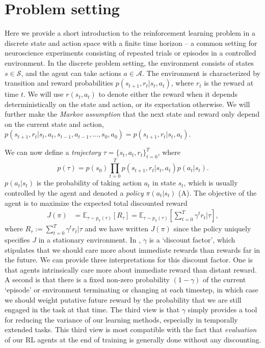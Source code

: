 \section{Problem setting}
\label{sec:problem_setting}

Here we provide a short introduction to the reinforcement learning problem in a discrete state and action space with a finite time horizon -- a common setting for neuroscience experiments consisting of repeated trials or episodes in a controlled environment.
In the discrete problem setting, the environment consists of states $s \in \mathcal{S}$, and the agent can take actions $a \in \mathcal{A}$.
The environment is characterized by transition and reward probabilities $p(s_{t+1}, r_t | s_t, a_t)$, where $r_t$ is the reward at time $t$.
We will use $r(s_t, a_t)$ to denote either the reward when it depends deterministically on the state and action, or its expectation otherwise.
We will further make the \emph{Markov assumption} that the next state and reward only depend on the current state and action, $p(s_{t+1}, r_t | s_t, a_t, s_{t-1}, a_{t-1}, ..., s_0, a_0) = p(s_{t+1}, r_t | s_t, a_t)$.



We can now define a \emph{trajectory} $\tau = \{ s_t, a_t, r_t \}_{t = 0}^T$, where
\begin{equation}
    p(\tau) = p(s_0) \prod_{t = 0}^T p(s_{t+1}, r_t | s_t, a_t) p(a_t|s_t).
\end{equation}
$p(a_t|s_t)$ is the probability of taking action $a_t$ in state $s_t$, which is usually controlled by the agent and denoted a \emph{policy} $\pi(a_t|s_t)$ (A).
The objective of the agent is to maximize the expected total discounted reward
\begin{align}
    \label{eq:RL_objective}
    J(\pi) &= \mathbb{E}_{\tau \sim p_\pi(\tau)} \left [ R_\tau \right ] = \mathbb{E}_{\tau \sim p_\pi(\tau)} \left [ \sum_{t=0}^T \gamma^t r_t | \tau \right ],
\end{align}
where $R_\tau := \sum_{t=0}^T \gamma^t r_t | \tau$ and we have written $J(\pi)$ since the policy uniquely specifies $J$ in a stationary environment.
In , $\gamma$ is a `discount factor', which stipulates that we should care more about immediate rewards than rewards far in the future.
We can provide three interpretations for this discount factor.
One is that agents intrinsically care more about immediate reward than distant reward.
A second is that there is a fixed non-zero probability $(1-\gamma)$ of the current `episode' or environment terminating or changing at each timestep, in which case we should weight putative future reward by the probability that we are still engaged in the task at that time.
The third view is that $\gamma$ simply provides a tool for reducing the variance of our learning methods, especially in temporally extended tasks.
This third view is most compatible with the fact that \emph{evaluation} of our RL agents at the end of training is generally done without any discounting.

